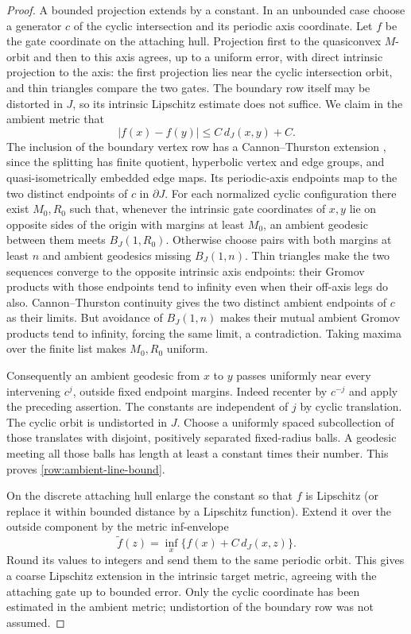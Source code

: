 \begin{proof}
A bounded projection extends by a constant. In an unbounded case
choose a generator \(c\) of the cyclic intersection and its periodic
axis coordinate. Let \(f\) be the gate coordinate on the attaching
hull. Projection first to the quasiconvex \(M\)-orbit and then to
this axis agrees, up to a uniform error, with direct intrinsic
projection to the axis: the first projection lies near the cyclic
intersection orbit, and thin triangles compare the two gates.
The boundary row itself may be distorted in \(J\), so its intrinsic
Lipschitz estimate does not suffice. We claim in the ambient metric that
\begin{equation}\label{row:ambient-line-bound}
 |f(x)-f(y)|\leq C\,d_J(x,y)+C.
\end{equation}
The inclusion of the boundary vertex row has a Cannon--Thurston
extension \cite[Corollary~3.11]{Mitra1998}, since the splitting has
finite quotient, hyperbolic vertex and edge groups, and
quasi-isometrically embedded edge maps. Its periodic-axis endpoints map to the
two distinct endpoints of \(c\) in \(\partial J\).
For each normalized cyclic configuration there exist \(M_0,R_0\)
such that, whenever the intrinsic gate coordinates of \(x,y\) lie
on opposite sides of the origin with margins at least \(M_0\), an
ambient geodesic between them meets \(B_J(1,R_0)\). Otherwise choose
pairs with both margins at least \(n\) and ambient geodesics missing
\(B_J(1,n)\). Thin triangles make the two sequences converge to the
opposite intrinsic axis endpoints: their Gromov products with those
endpoints tend to infinity even when their off-axis legs do also.
Cannon--Thurston continuity gives the two distinct ambient endpoints
of \(c\) as their limits. But avoidance of \(B_J(1,n)\) makes their
mutual ambient Gromov products tend to infinity, forcing the same
limit, a contradiction. Taking maxima over the finite list makes
\(M_0,R_0\) uniform.

Consequently an ambient geodesic from \(x\) to \(y\) passes uniformly
near every intervening \(c^j\), outside fixed endpoint margins.
Indeed recenter by \(c^{-j}\) and apply the preceding assertion.
The constants are independent of \(j\) by cyclic translation. The cyclic orbit
is undistorted in \(J\). Choose a uniformly spaced subcollection of
those translates with disjoint, positively separated fixed-radius
balls. A geodesic meeting all those balls has length at least a
constant times their number. This proves
\eqref{row:ambient-line-bound}.

On the discrete attaching hull enlarge the constant so that \(f\)
is Lipschitz (or replace it within bounded distance by a Lipschitz
function). Extend it over the outside component by the metric
inf-envelope
\[
 \widetilde f(z)=\inf_x\{f(x)+C\,d_J(x,z)\}.
\]
Round its values to integers and send them to the same periodic
orbit. This gives a coarse Lipschitz extension in the intrinsic
target metric, agreeing with the attaching gate up to bounded
error. Only the cyclic coordinate has been estimated in the
ambient metric; undistortion of the boundary row was not assumed.


\end{proof}
